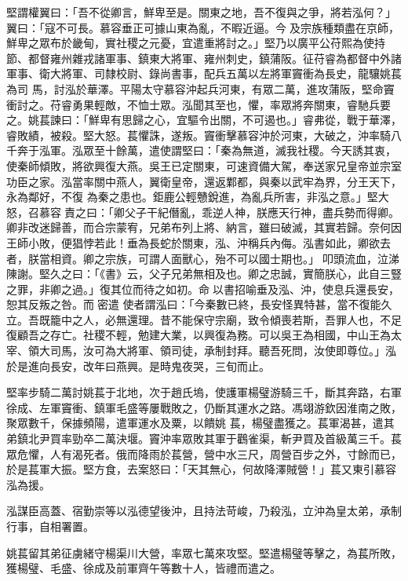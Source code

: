 \begin{pinyinscope}
 堅謂權翼曰：「吾不從卿言，鮮卑至是。關東之地，吾不復與之爭，將若泓何？」翼曰：「寇不可長。慕容垂正可據山東為亂，不暇近逼。今及宗族種類盡在京師，鮮卑之眾布於畿甸，實社稷之元憂，宜遣重將討之。」堅乃以廣平公苻熙為使持節、都督雍州雜戎諸軍事、鎮東大將軍、雍州刺史，鎮蒲阪。征苻睿為都督中外諸軍事、衛大將軍、司隸校尉、錄尚書事，配兵五萬以左將軍竇衝為長史，龍驤姚萇為司
 馬，討泓於華澤。平陽太守慕容沖起兵河東，有眾二萬，進攻蒲阪，堅命竇衝討之。苻睿勇果輕敵，不恤士眾。泓聞其至也，懼，率眾將奔關東，睿馳兵要之。姚萇諫曰：「鮮卑有思歸之心，宜驅令出關，不可遏也。」睿弗從，戰于華澤，睿敗績，被殺。堅大怒。萇懼誅，遂叛。竇衝擊慕容沖於河東，大破之，沖率騎八千奔于泓軍。泓眾至十餘萬，遣使謂堅曰：「秦為無道，滅我社稷。今天誘其衷，使秦師傾敗，將欲興復大燕。吳王已定關東，可速資備大駕，奉送家兄皇帝並宗室功臣之家。泓當率關中燕人，翼衛皇帝，還返鄴都，與秦以武牢為界，分王天下，永為鄰好，不復
 為秦之患也。鉅鹿公輕戇銳進，為亂兵所害，非泓之意。」堅大怒，召慕容責之曰：「卿父子干紀僭亂，乖逆人神，朕應天行神，盡兵勢而得卿。卿非改迷歸善，而合宗蒙宥，兄弟布列上將、納言，雖曰破滅，其實若歸。奈何因王師小敗，便猖悖若此！垂為長蛇於關東，泓、沖稱兵內侮。泓書如此，卿欲去者，朕當相資。卿之宗族，可謂人面獸心，殆不可以國士期也。」叩頭流血，泣涕陳謝。堅久之曰：「《書》云，父子兄弟無相及也。卿之忠誠，實簡朕心，此自三豎之罪，非卿之過。」復其位而待之如初。命以書招喻垂及泓、沖，使息兵還長安，恕其反叛之咎。而密遣
 使者謂泓曰：「今秦數已終，長安怪異特甚，當不復能久立。吾既籠中之人，必無還理。昔不能保守宗廟，致令傾喪若斯，吾罪人也，不足復顧吾之存亡。社稷不輕，勉建大業，以興復為務。可以吳王為相國，中山王為太宰、領大司馬，汝可為大將軍、領司徒，承制封拜。聽吾死問，汝使即尊位。」泓於是進向長安，改年曰燕興。是時鬼夜哭，三旬而止。



 堅率步騎二萬討姚萇于北地，次于趙氏塢，使護軍楊璧游騎三千，斷其奔路，右軍徐成、左軍竇衝、鎮軍毛盛等屢戰敗之，仍斷其運水之路。馮翊游欽因淮南之敗，聚眾數千，保據頻陽，遣軍運水及粟，以饋姚
 萇，楊璧盡獲之。萇軍渴甚，遣其弟鎮北尹買率勁卒二萬決堰。竇沖率眾敗其軍于鸛雀渠，斬尹買及首級萬三千。萇眾危懼，人有渴死者。俄而降雨於萇營，營中水三尺，周營百步之外，寸餘而已，於是萇軍大振。堅方食，去案怒曰：「天其無心，何故降澤賊營！」萇又東引慕容泓為援。



 泓謀臣高蓋、宿勤崇等以泓德望後沖，且持法苛峻，乃殺泓，立沖為皇太弟，承制行事，自相署置。



 姚萇留其弟征虜緒守楊渠川大營，率眾七萬來攻堅。堅遣楊璧等擊之，為萇所敗，獲楊璧、毛盛、徐成及前軍齊午等數十人，皆禮而遣之。




\end{pinyinscope}

